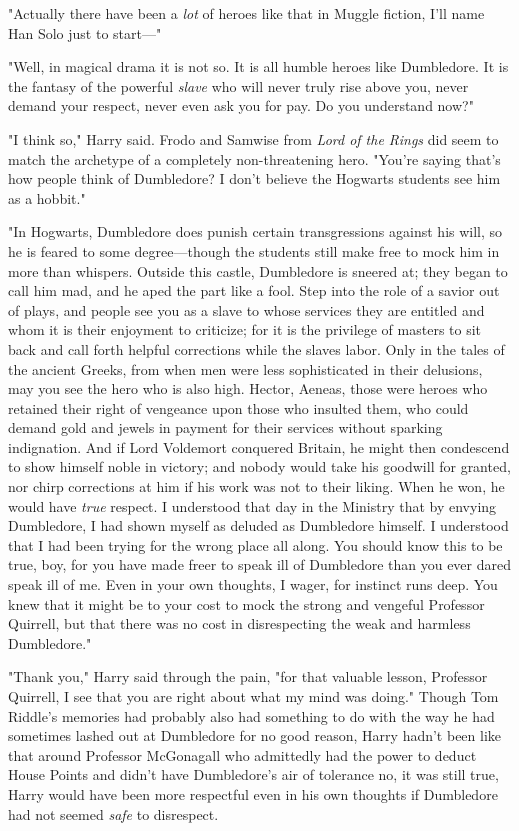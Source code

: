 "Actually there have been a \emph{lot} of heroes like that in Muggle fiction,
I'll name Han Solo just to start\mbox{---}"

"Well, in magical drama it is not so. It is all humble heroes like Dumbledore.
It is the fantasy of the powerful \emph{slave} who will never truly rise above
you, never demand your respect, never even ask you for pay. Do you understand
now?"

"I{\el} think so," Harry said. Frodo and Samwise from \emph{Lord of the
Rings} did seem to match the archetype of a completely non-threatening hero.
"You're saying that's how people think of Dumbledore? I don't believe the
Hogwarts students see him as a hobbit."

"In Hogwarts, Dumbledore does punish certain transgressions against his will,
so he is feared to some degree---though the students still make free to mock
him in more than whispers. Outside this castle, Dumbledore is sneered at; they
began to call him mad, and he aped the part like a fool. Step into the role of
a savior out of plays, and people see you as a slave to whose services they are
entitled and whom it is their enjoyment to criticize; for it is the privilege
of masters to sit back and call forth helpful corrections while the slaves
labor. Only in the tales of the ancient Greeks, from when men were less
sophisticated in their delusions, may you see the hero who is also high.
Hector, Aeneas, those were heroes who retained their right of vengeance upon
those who insulted them, who could demand gold and jewels in payment for their
services without sparking indignation. And if Lord Voldemort conquered Britain,
he might then condescend to show himself noble in victory; and nobody would
take his goodwill for granted, nor chirp corrections at him if his work was not
to their liking. When he won, he would have \emph{true} respect. I understood
that day in the Ministry that by envying Dumbledore, I had shown myself as
deluded as Dumbledore himself. I understood that I had been trying for the
wrong place all along. You should know this to be true, boy, for you have made
freer to speak ill of Dumbledore than you ever dared speak ill of me. Even in
your own thoughts, I wager, for instinct runs deep. You knew that it might be
to your cost to mock the strong and vengeful Professor Quirrell, but that there
was no cost in disrespecting the weak and harmless Dumbledore."

"Thank you," Harry said through the pain, "for that valuable lesson, Professor
Quirrell, I see that you are right about what my mind was doing." Though Tom
Riddle's memories had probably also had something to do with the way he had
sometimes lashed out at Dumbledore for no good reason, Harry hadn't been like
that around Professor McGonagall{\el} who admittedly had the power to deduct
House Points and didn't have Dumbledore's air of tolerance{\el} no, it was
still true, Harry would have been more respectful even in his own thoughts if
Dumbledore had not seemed \emph{safe} to disrespect.

